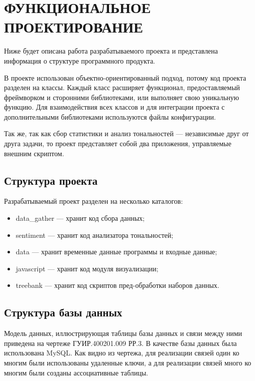 \section{ФУНКЦИОНАЛЬНОЕ ПРОЕКТИРОВАНИЕ}
 \label{sec:functional}
Ниже будет описана работа разрабатываемого проекта и представлена информация о структуре программного продукта.

В проекте использован объектно-ориентированный подход, потому код проекта разделен на классы. Каждый класс расширяет функционал, предоставляемый фреймворком и сторонними библиотеками, или выполняет свою уникальную функцию. Для взаимодействия всех классов и для интеграции проекта с дополнительными библиотеками используются файлы конфигурации.

Так же, так как сбор статистики и анализ тональностей --- независимые друг от друга задачи, то проект представляет собой два приложения, управляемые внешним скриптом.
\subsection{Структура проекта}
Разрабатываемый проект разделен на несколько каталогов:
\begin{itemize}
\item data\_gather --- хранит код сбора данных;
\item sentiment --- хранит код анализатора тональностей;
\item data --- хранит временные данные программы и входные данные;
\item javascript --- хранит код модуля визуализации;
\item treebank --- хранит код скриптов пред-обработки наборов данных.
\end{itemize}
\subsection{Структура базы данных}
Модель данных, иллюстрирующая таблицы базы данных и связи между ними приведена на чертеже ГУИР.400201.009 РР.3. В качестве базы данных была использована MySQL\@. Как видно из чертежа, для реализации связей один ко многим были использованы удаленные ключи, а для реализации связей много ко многим были созданы ассоциативные таблицы.
